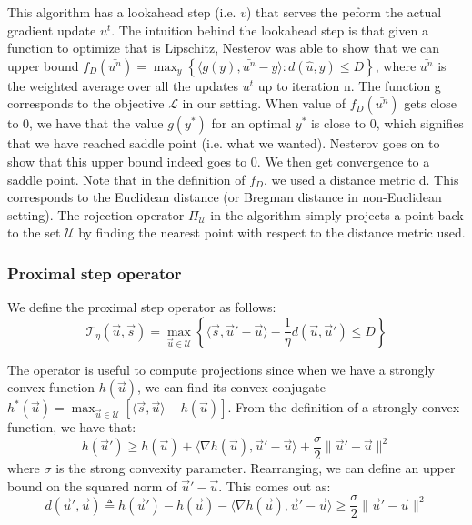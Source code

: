 This algorithm has a lookahead step (i.e. $v$) that serves the peform the actual
gradient update $u^t$. The intuition behind the lookahead step is that given a
function to optimize that is Lipschitz, Nesterov was able to show that we can
upper bound $f_{D}(\bar{u^n}) = \max_y \left \{ \langle g(y),\bar{u^n} - y
\rangle : d(\hat{u},y) \leq D \right \}$, where $\bar{u^n}$ is the weighted
average over all the updates $u^t$ up to iteration n. The function g corresponds
to the objective $\mathcal{L}$ in our setting. When value of $f_D(\bar{u^n})$
gets close to 0, we have that the value $g(y^*)$ for an optimal $y^*$ is close
to 0, which signifies that we have reached saddle point (i.e. what we wanted).
Nesterov goes on to show that this upper bound indeed goes to 0. We then get
convergence to a saddle point. Note that in the definition of $f_D$, we used a
distance metric d. This corresponds to the Euclidean distance (or Bregman
distance in non-Euclidean setting). The rojection operator $\Pi_{\mathcal{U}}$
in the algorithm simply projects a point back to the set $\mathcal{U}$ by
finding the nearest point with respect to the distance metric used.
\subsubsection{Proximal step operator}
We define the proximal step operator as follows:
\begin{equation}
  \mathcal{T}_{\eta}(\vec u, \vec s) = \max_{\vec u \in \mathcal{U}} \left \{
\langle \vec s, \vec u' - \vec u \rangle - \frac{1}{\eta} d(\vec u, \vec u')
\leq D \right \}
\end{equation}

The operator is useful to compute projections since when we have a strongly
convex function $h(\vec u)$, we can find its convex conjugate $h^*(\vec u) =
\max_{\vec u \in \mathcal{U}} \left [ \langle \vec s, \vec u \rangle - h(\vec u)
\right ]$. From the definition of a strongly convex function, we have that:
\begin{equation}
  h(\vec u') \geq h(\vec u) + \langle \nabla h(\vec u), \vec u'  - \vec u \rangle + \frac{\sigma}{2} \lVert \vec u' - \vec u \rVert^2
\end{equation}
where $\sigma$ is the strong convexity parameter. Rearranging, we can define an upper bound on the squared norm of $\vec u' - \vec u$. This comes out as:
\begin{equation}
  d(\vec u', \vec u) \triangleq h(\vec u') - h(\vec u) - \langle \nabla h(\vec u), \vec u' - \vec u \rangle \geq \frac{\sigma}{2} \lVert \vec u' - \vec u \rVert^2
\end{equation}

